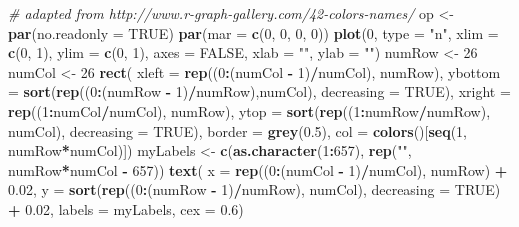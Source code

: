 \documentclass[]{book}
\newenvironment{Shaded}{\begin{snugshade}}{\end{snugshade}}
\newcommand{\CommentTok}[1]{\textcolor[rgb]{0.56,0.35,0.01}{\textit{#1}}}
\newcommand{\DataTypeTok}[1]{\textcolor[rgb]{0.13,0.29,0.53}{#1}}
\newcommand{\DecValTok}[1]{\textcolor[rgb]{0.00,0.00,0.81}{#1}}
\newcommand{\FloatTok}[1]{\textcolor[rgb]{0.00,0.00,0.81}{#1}}
\newcommand{\KeywordTok}[1]{\textcolor[rgb]{0.13,0.29,0.53}{\textbf{#1}}}
\newcommand{\NormalTok}[1]{#1}
\newcommand{\OperatorTok}[1]{\textcolor[rgb]{0.81,0.36,0.00}{\textbf{#1}}}
\newcommand{\OtherTok}[1]{\textcolor[rgb]{0.56,0.35,0.01}{#1}}
\newcommand{\StringTok}[1]{\textcolor[rgb]{0.31,0.60,0.02}{#1}}
\begin{document}
\begin{Shaded}
\begin{Highlighting}[]
\CommentTok{# adapted from http://www.r-graph-gallery.com/42-colors-names/}
\NormalTok{op <-}\StringTok{ }\KeywordTok{par}\NormalTok{(}\DataTypeTok{no.readonly =} \OtherTok{TRUE}\NormalTok{)}
\KeywordTok{par}\NormalTok{(}\DataTypeTok{mar =} \KeywordTok{c}\NormalTok{(}\DecValTok{0}\NormalTok{, }\DecValTok{0}\NormalTok{, }\DecValTok{0}\NormalTok{, }\DecValTok{0}\NormalTok{))}
\KeywordTok{plot}\NormalTok{(}\DecValTok{0}\NormalTok{, }\DataTypeTok{type =} \StringTok{"n"}\NormalTok{, }\DataTypeTok{xlim =} \KeywordTok{c}\NormalTok{(}\DecValTok{0}\NormalTok{, }\DecValTok{1}\NormalTok{), }\DataTypeTok{ylim =} \KeywordTok{c}\NormalTok{(}\DecValTok{0}\NormalTok{, }\DecValTok{1}\NormalTok{), }
  \DataTypeTok{axes =} \OtherTok{FALSE}\NormalTok{, }\DataTypeTok{xlab =} \StringTok{""}\NormalTok{, }\DataTypeTok{ylab =} \StringTok{""}\NormalTok{)}
\NormalTok{numRow <-}\StringTok{ }\DecValTok{26}
\NormalTok{numCol <-}\StringTok{ }\DecValTok{26}
\KeywordTok{rect}\NormalTok{(}
  \DataTypeTok{xleft =} \KeywordTok{rep}\NormalTok{((}\DecValTok{0}\OperatorTok{:}\NormalTok{(numCol }\OperatorTok{-}\StringTok{ }\DecValTok{1}\NormalTok{)}\OperatorTok{/}\NormalTok{numCol), numRow),  }
  \DataTypeTok{ybottom =} \KeywordTok{sort}\NormalTok{(}\KeywordTok{rep}\NormalTok{((}\DecValTok{0}\OperatorTok{:}\NormalTok{(numRow }\OperatorTok{-}\StringTok{ }\DecValTok{1}\NormalTok{)}\OperatorTok{/}\NormalTok{numRow),numCol), }\DataTypeTok{decreasing =} \OtherTok{TRUE}\NormalTok{),}
  \DataTypeTok{xright =} \KeywordTok{rep}\NormalTok{((}\DecValTok{1}\OperatorTok{:}\NormalTok{numCol}\OperatorTok{/}\NormalTok{numCol), numRow),}
  \DataTypeTok{ytop =} \KeywordTok{sort}\NormalTok{(}\KeywordTok{rep}\NormalTok{((}\DecValTok{1}\OperatorTok{:}\NormalTok{numRow}\OperatorTok{/}\NormalTok{numRow), numCol), }\DataTypeTok{decreasing =} \OtherTok{TRUE}\NormalTok{),}
  \DataTypeTok{border =} \KeywordTok{grey}\NormalTok{(}\FloatTok{0.5}\NormalTok{), }
  \DataTypeTok{col =} \KeywordTok{colors}\NormalTok{()[}\KeywordTok{seq}\NormalTok{(}\DecValTok{1}\NormalTok{, numRow}\OperatorTok{*}\NormalTok{numCol)])}
\NormalTok{myLabels <-}\StringTok{ }\KeywordTok{c}\NormalTok{(}\KeywordTok{as.character}\NormalTok{(}\DecValTok{1}\OperatorTok{:}\DecValTok{657}\NormalTok{), }\KeywordTok{rep}\NormalTok{(}\StringTok{""}\NormalTok{, numRow}\OperatorTok{*}\NormalTok{numCol }\OperatorTok{-}\StringTok{ }\DecValTok{657}\NormalTok{))}
\KeywordTok{text}\NormalTok{(}
  \DataTypeTok{x =} \KeywordTok{rep}\NormalTok{((}\DecValTok{0}\OperatorTok{:}\NormalTok{(numCol }\OperatorTok{-}\StringTok{ }\DecValTok{1}\NormalTok{)}\OperatorTok{/}\NormalTok{numCol), numRow) }\OperatorTok{+}\StringTok{ }\FloatTok{0.02}\NormalTok{,}
  \DataTypeTok{y =} \KeywordTok{sort}\NormalTok{(}\KeywordTok{rep}\NormalTok{((}\DecValTok{0}\OperatorTok{:}\NormalTok{(numRow }\OperatorTok{-}\StringTok{ }\DecValTok{1}\NormalTok{)}\OperatorTok{/}\NormalTok{numRow), numCol), }\DataTypeTok{decreasing =} \OtherTok{TRUE}\NormalTok{) }\OperatorTok{+}\StringTok{ }\FloatTok{0.02}\NormalTok{,}
  \DataTypeTok{labels =}\NormalTok{ myLabels, }
  \DataTypeTok{cex =} \FloatTok{0.6}\NormalTok{)}
\end{Highlighting}
\end{Shaded}
\end{document}
